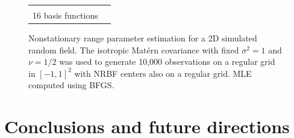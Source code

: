 \documentclass{article}
\numberwithin{equation}{section}
\begin{document}
\begin{figure}[H]
\begin{tabular}{cc}
\begin{subfigure}[t]{0.3\textwidth}
      \caption{Error \\ 16 basis functions}
    \end{subfigure}
    }
  \end{tabular}
  \caption{Nonstationary range parameter estimation for a 2D simulated random field. The isotropic Mat\'ern covariance with fixed $\sigma^2=1$ and $\nu=1/2$ was used to generate 10,000 observations on a regular grid in $[-1,1]^2$ with NRBF centers also on a regular grid. MLE computed using BFGS.}
  \label{fig:2d}
\end{figure}

\section{Conclusions and future directions} \label{sec:conclusions}

{}

\end{document}
